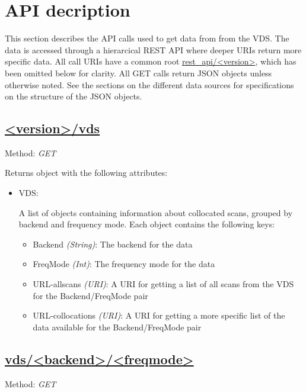 \section{API decription}
\label{sec:api}
This section describes the API calls used to get data from from the VDS.  The
data is accessed through a hierarcical REST API where deeper URIs return more
specific data.  All call URIs have a common root \url{rest_api/<version>}, which
has been omitted below for clarity.  All GET calls return JSON objects unless
otherwise noted. See the sections on the different data sources for
specifications on the structure of the JSON objects.


\subsection{\url{<version>/vds}}
Method: \emph{GET}

Returns object with the following attributes:
\begin{itemize}
    \item VDS:

        A list of objects containing information about collocated scans,
        grouped by backend and frequency mode.
        Each object contains the following keys:

        \begin{itemize}
            \item Backend \emph{(String)}: The backend for the data
            \item FreqMode \emph{(Int)}: The frequency mode for the data
            \item URL-allscans \emph{(URI)}: A URI for getting a list of all
                scans from the VDS for the Backend/FreqMode pair
            \item URL-collocations \emph{(URI)}: A URI for getting a more
                specific list of the data available for the Backend/FreqMode
                pair
        \end{itemize}
\end{itemize}


\subsection{\url{vds/<backend>/<freqmode>}}
Method: \emph{GET}

